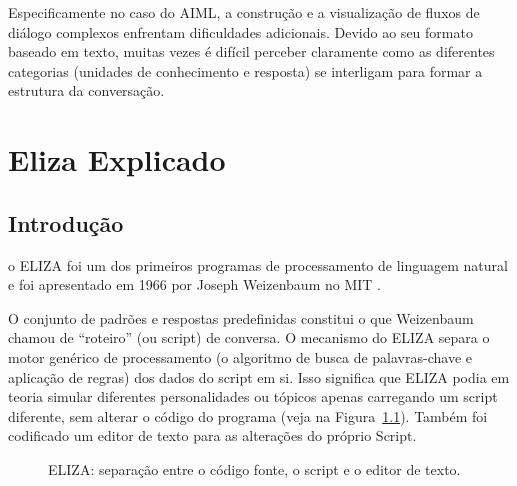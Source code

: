 \documentclass[14pt,a4paper,oneside]{book}
\begin{document}
Especificamente no caso do AIML, a construção e a visualização de fluxos de diálogo complexos enfrentam dificuldades adicionais. Devido ao seu formato baseado em texto, muitas vezes é difícil perceber claramente como as diferentes categorias (unidades de conhecimento e resposta) se interligam para formar a estrutura da conversação.



\chapter{Eliza Explicado}

\section{Introdução}

o ELIZA foi um dos primeiros programas de processamento de linguagem natural e foi apresentado em 1966 por Joseph Weizenbaum no MIT \cite{Weizenbaum1996}.

O conjunto de padrões e respostas predefinidas constitui o que Weizenbaum chamou de “roteiro” (ou script) de conversa. O mecanismo do ELIZA separa o motor genérico de processamento (o algoritmo de busca de palavras-chave e aplicação de regras) dos dados do script em si. Isso significa que ELIZA podia em teoria simular diferentes personalidades ou tópicos apenas carregando um script diferente, sem alterar o código do programa (veja na Figura~\ref{fig:elizaeditor}). Também foi codificado um editor de texto para as alterações do próprio Script.

\begin{figure}[!htbp]
	\centering	
	\caption{ELIZA: separação entre o código fonte, o script e o editor de texto.}
	\label{fig:elizaeditor}
\end{figure}
\end{document}
